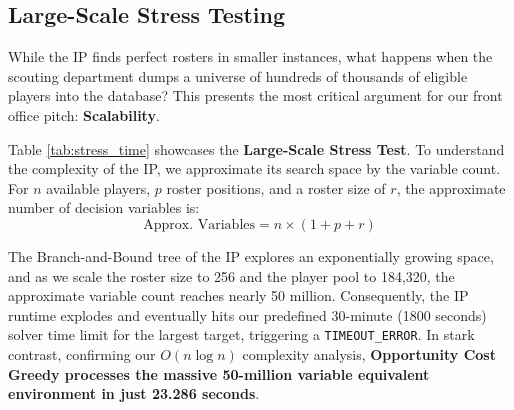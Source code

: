 \documentclass[11pt,a4paper]{article}
\begin{document}
\subsection{Large-Scale Stress Testing}

While the IP finds perfect rosters in smaller instances, what happens when the scouting department dumps a universe of hundreds of thousands of eligible players into the database? This presents the most critical argument for our front office pitch: \textbf{Scalability}. 

Table \ref{tab:stress_time} showcases the \textbf{Large-Scale Stress Test}. To understand the complexity of the IP, we approximate its search space by the variable count. For $n$ available players, $p$ roster positions, and a roster size of $r$, the approximate number of decision variables is:
\[ \text{Approx. Variables} = n \times (1 + p + r) \]

The Branch-and-Bound tree of the IP explores an exponentially growing space, and as we scale the roster size to 256 and the player pool to 184,320, the approximate variable count reaches nearly 50 million. Consequently, the IP runtime explodes and eventually hits our predefined 30-minute (1800 seconds) solver time limit for the largest target, triggering a \texttt{TIMEOUT\_ERROR}. In stark contrast, confirming our $O(n \log n)$ complexity analysis, \textbf{Opportunity Cost Greedy processes the massive 50-million variable equivalent environment in just 23.286 seconds}.


\begin{table}[H]
\centering
\small
\caption{Stress Test: Execution Times for DG, OCG, and IP.}
\label{tab:stress_time}
\end{table}
\end{document}
